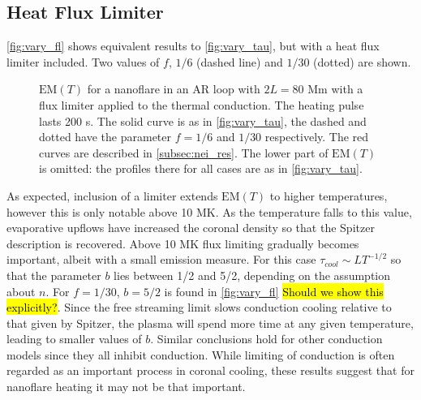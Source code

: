 \documentclass[apj]{emulateapj}
\begin{document}
	\subsection{Heat Flux Limiter}
	\label{subsec:hf_res}
	\autoref{fig:vary_fl} shows equivalent results to \autoref{fig:vary_tau}, but with a heat flux limiter included. Two values of $f$, $1/6$ (dashed line) and $1/30$ (dotted) are shown.
	\begin{figure}
		\centering
		\caption{$\mathrm{EM}(T)$ for a nanoflare in an AR loop with $2L = 80$ Mm with a flux limiter applied to the thermal conduction. The heating pulse lasts 200 s. The solid curve is as in \autoref{fig:vary_tau}, the dashed and dotted have the parameter $f = 1/6$ and $1/30$ respectively. The red curves are described in \autoref{subsec:nei_res}. The lower part of $\mathrm{EM}(T)$ is omitted: the profiles there for all cases are as in \autoref{fig:vary_tau}.}
		\label{fig:vary_fl}
	\end{figure}
	\par As expected, inclusion of a limiter extends $\mathrm{EM}(T)$ to higher temperatures, however this is only notable above 10 MK. As the temperature falls to this value, evaporative upflows have increased the coronal density so that the Spitzer description is recovered. Above 10 MK flux limiting gradually becomes important, albeit with a small emission measure. For this case $\tau_{cool} \sim LT^{-1/2}$ so that the parameter $b$ lies between 1/2 and 5/2, depending on the assumption about $n$. For $f = 1/30$, $b = 5/2$ is found in \autoref{fig:vary_fl} \hl{Should we show this explicitly?}. Since the free streaming limit slows conduction cooling relative to that given by Spitzer, the plasma will spend more time at any given temperature, leading to smaller values of $b$. Similar conclusions hold for other conduction models \citep[e.g. the non-local model discussed in the coronal context by][]{karpen_nonlocal_1987,west_lifetime_2008} since they all inhibit conduction. While limiting of conduction is often regarded as an important process in coronal cooling, these results suggest that for nanoflare heating it may not be that important.
\end{document}
